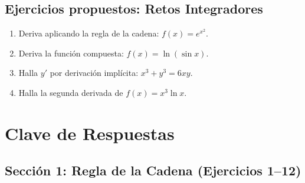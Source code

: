 \documentclass[12pt, letterpaper]{article}
\begin{document}
\newpage


\subsection{Ejercicios propuestos: Retos Integradores}

\begin{enumerate}[resume=ejercicios, leftmargin=*]
  \item \medio{} Deriva aplicando la regla de la cadena: $f(x) = e^{x^2}$.

  \item \dificil{} Deriva la función compuesta: $f(x) = \ln(\sin x)$.

  \item \dificil{} Halla $y'$ por derivación implícita: $x^3 + y^3 = 6xy$.

  \item \muyDificil{} Halla la segunda derivada de $f(x) = x^3 \ln x$.
\end{enumerate}
\newpage
\ifmwclaves
\section{Clave de Respuestas}

\subsection*{Sección 1: Regla de la Cadena (Ejercicios 1--12)}
\end{document}
